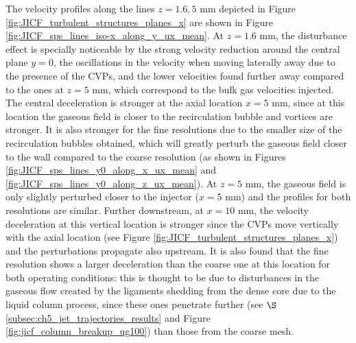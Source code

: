 The velocity profiles along the lines $z = 1.6, 5$ mm depicted in Figure \ref{fig:JICF_turbulent_structures_planes_x} are shown in Figure \ref{fig:JICF_sps_lines_iso-x_along_y_ux_mean}. At $z = 1.6$ mm, the disturbance effect is specially noticeable by the strong velocity reduction around the central plane $y = 0$, the oscillations in the velocity when moving laterally away due to the presence of the CVPs, and the lower velocities found further away compared to the ones at $z = 5$  mm, which correspond to the bulk gas velocities injected. The central deceleration is stronger at the axial location $x = 5$ mm, since at this location the gaseous field is closer to the recirculation bubble and vortices are stronger. It is also stronger for the fine resolutions due to the smaller size of the recirculation bubbles obtained, which will greatly perturb the gaseous field closer to the wall compared to the coarse resolution (as shown in Figures \ref{fig:JICF_sps_lines_y0_along_x_ux_mean} and \ref{fig:JICF_sps_lines_y0_along_z_ux_mean}).  At $z = 5$ mm, the gaseous field is only slightly perturbed closer to the injector ($x = 5$ mm) and the profiles for both resolutions are similar. Further downstream, at $x = 10$ mm, the velocity deceleration at this vertical location is stronger since the CVPs move vertically with the axial location (see Figure \ref{fig:JICF_turbulent_structures_planes_x}) and the perturbations propagate also upstream. It is also found that the fine resolution shows a larger deceleration  than the coarse one at this location for both operating conditions: this is thought to be due to disturbances in the gaseous flow created by the ligaments shedding from the dense core due to the liquid column process, since these ones penetrate further (see $\S$\ref{subsec:ch5_jet_trajectories_results} and Figure \ref{fig:jicf_column_breakup_ug100}) than those from the coarse mesh. 

